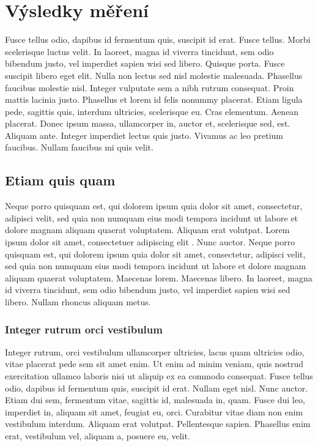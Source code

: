 \section{Výsledky měření}
Fusce tellus odio, dapibus id fermentum quis, suscipit id erat. Fusce tellus. Morbi scelerisque luctus velit. In laoreet, magna id viverra tincidunt, sem odio bibendum justo, vel imperdiet sapien wisi sed libero. Quisque porta. Fusce suscipit libero eget elit. Nulla non lectus sed nisl molestie malesuada. Phasellus faucibus molestie nisl. Integer vulputate sem a nibh rutrum consequat. Proin mattis lacinia justo. Phasellus et lorem id felis nonummy placerat. Etiam ligula pede, sagittis quis, interdum ultricies, scelerisque eu. Cras elementum. Aenean placerat. Donec ipsum massa, ullamcorper in, auctor et, scelerisque sed, est. Aliquam ante. Integer imperdiet lectus quis justo. Vivamus ac leo pretium faucibus. Nullam faucibus mi quis velit.

\subsection{Etiam quis quam}
Neque porro quisquam est, qui dolorem ipsum quia dolor sit amet, consectetur, adipisci velit, sed quia non numquam eius modi tempora incidunt ut labore et dolore magnam aliquam quaerat voluptatem. Aliquam erat volutpat. Lorem ipsum dolor sit amet, consectetuer adipiscing elit \cite{sr02/2009,pravidla}. Nunc auctor. Neque porro quisquam est, qui dolorem ipsum quia dolor sit amet, consectetur, adipisci velit, sed quia non numquam eius modi tempora incidunt ut labore et dolore magnam aliquam quaerat voluptatem. Maecenas lorem. Maecenas libero. In laoreet, magna id viverra tincidunt, sem odio bibendum justo, vel imperdiet sapien wisi sed libero. Nullam rhoncus aliquam metus.

\subsubsection{Integer rutrum orci vestibulum}
Integer rutrum, orci vestibulum ullamcorper ultricies, lacus quam ultricies odio, vitae placerat pede sem sit amet enim. Ut enim ad minim veniam, quis nostrud exercitation ullamco laboris nisi ut aliquip ex ea commodo consequat. Fusce tellus odio, dapibus id fermentum quis, suscipit id erat. Nullam eget nisl. Nunc auctor. Etiam dui sem, fermentum vitae, sagittis id, malesuada in, quam. Fusce dui leo, imperdiet in, aliquam sit amet, feugiat eu, orci. Curabitur vitae diam non enim vestibulum interdum. Aliquam erat volutpat. Pellentesque sapien. Phasellus enim erat, vestibulum vel, aliquam a, posuere eu, velit.

